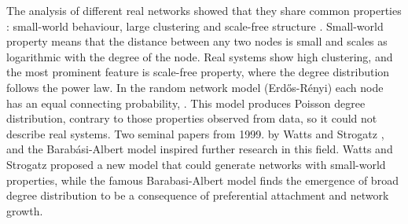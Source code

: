 The analysis of different real networks showed that they share common properties \cite{boccaletti2006complex}: small-world behaviour, large clustering and scale-free structure \cite{barabasi2009,newman2010}. Small-world property means that the distance between any two nodes is small and scales as logarithmic with the degree of the node. Real systems show high clustering, and the most prominent feature is scale-free property, where the degree distribution follows the power law. In the random network model (Erdős-Rényi) each node has an equal connecting probability, \cite{dorogovtsev2010complex}. This model produces Poisson degree distribution, contrary to those properties observed from data, so it could not describe real systems. Two seminal papers from 1999. by Watts and Strogatz \cite{watts1998collective}, and the Barabási-Albert model \cite{barabasi1999} inspired further research in this field. Watts and Strogatz  \cite{watts1998collective} proposed a new model that could generate networks with small-world properties, while the famous Barabasi-Albert model \cite{barabasi1999} finds the emergence of broad degree distribution to be a consequence of preferential attachment and network growth. 


